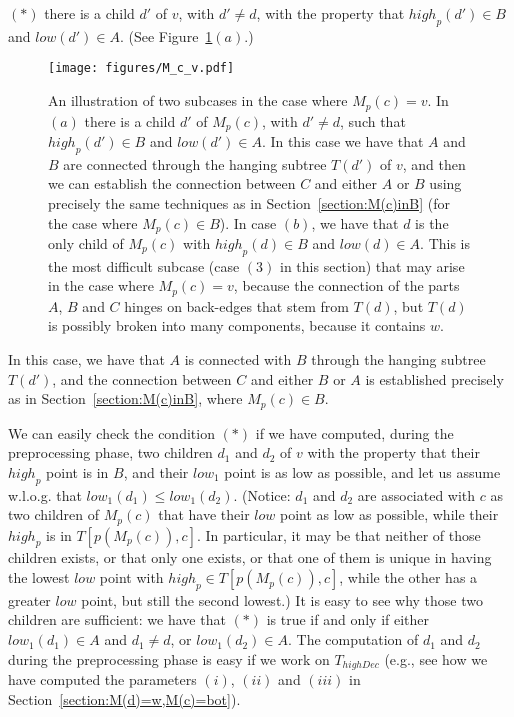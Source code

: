 \documentclass[11pt,a4paper]{article}
\begin{document}
$(*)$ there is a child $d'$ of $v$, with $d'\neq d$, with the property that $\mathit{high}_p(d')\in B$ and $\mathit{low}(d')\in A$. (See Figure~\ref{figure:M(c)=v}$(a)$.)\\

\begin{figure}[h!]\centering
\texttt{[image: figures/M\_c\_v.pdf]}
\caption{\small{An illustration of two subcases in the case where $M_p(c)=v$. In $(a)$ there is a child $d'$ of $M_p(c)$, with $d'\neq d$, such that $\mathit{high}_p(d')\in B$ and $\mathit{low}(d')\in A$. In this case we have that $A$ and $B$ are connected through the hanging subtree $T(d')$ of $v$, and then we can establish the connection between $C$ and either $A$ or $B$ using precisely the same techniques as in Section~\ref{section:M(c)inB} (for the case where $M_p(c)\in B$). In case $(b)$, we have that $d$ is the only child of $M_p(c)$ with $\mathit{high}_p(d)\in B$ and $\mathit{low}(d)\in A$. This is the most difficult subcase (case $(3)$ in this section) that may arise in the case where $M_p(c)=v$, because the connection of the parts $A$, $B$ and $C$ hinges on back-edges that stem from $T(d)$, but $T(d)$ is possibly broken into many components, because it contains $w$.}}\label{figure:M(c)=v}
\end{figure}

In this case, we have that $A$ is connected with $B$ through the hanging subtree $T(d')$, and the connection between $C$ and either $B$ or $A$ is established precisely as in Section~\ref{section:M(c)inB}, where $M_p(c)\in B$.

We can easily check the condition $(*)$ if we have computed, during the preprocessing phase, two children $d_1$ and $d_2$ of $v$ with the property that their $\mathit{high}_p$ point is in $B$, and their $\mathit{low}_1$ point is as low as possible, and let us assume w.l.o.g. that $\mathit{low}_1(d_1)\leq\mathit{low}_1(d_2)$. (Notice: $d_1$ and $d_2$ are associated with $c$ as two children of $M_p(c)$ that have their $\mathit{low}$ point as low as possible, while their $\mathit{high}_p$ is in $T[p(M_p(c)),c]$. In particular, it may be that neither of those children exists, or that only one exists, or that one of them is unique in having the lowest $\mathit{low}$ point with $\mathit{high}_p\in T[p(M_p(c)),c]$, while the other has a greater $\mathit{low}$ point, but still the second lowest.) It is easy to see why those two children are sufficient: we have that $(*)$ is true if and only if either $\mathit{low}_1(d_1)\in A$ and $d_1\neq d$, or $\mathit{low}_1(d_2)\in A$. The computation of $d_1$ and $d_2$ during the preprocessing phase is easy if we work on $T_\mathit{highDec}$ (e.g., see how we have computed the parameters $(i)$, $(ii)$ and $(iii)$ in Section~\ref{section:M(d)=w,M(c)=bot}).
\end{document}
